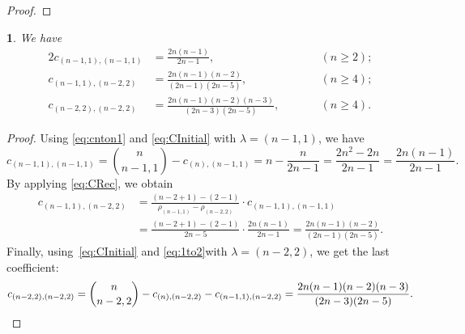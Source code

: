 \documentclass{mathincs}
\numberwithin{equation}{section}
\numberwithin{figure}{section}
\theoremstyle{plain}
\newtheorem{thm}{\protect\theoremname}[section]
\theoremstyle{definition}
\theoremstyle{remark}
\theoremstyle{plain}
\theoremstyle{definition}
\theoremstyle{plain}
\theoremstyle{plain}
\providecommand{\theoremname}{Theorem}
\begin{document}
\begin{proof}
\end{proof}

\begin{thm}
\label{thm:fam1}
We have
\begin{alignat*}{2}
  c_{(n-1,1),(n-1,1)} &= \frac{2n(n-1)}{2n-1}, &\qquad& (n\geq2); \\
  c_{(n-1,1),(n-2,2)} &= \frac{2n(n-1)(n-2)}{(2n-1)(2n-5)}, && (n\geq4); \\
  c_{(n-2,2),(n-2,2)} &= \frac{2n(n-1)(n-2)(n-3)}{(2n-3)(2n-5)}, &&(n\geq4).
\end{alignat*}
\end{thm}
\begin{proof}
Using \eqref{eq:cnton1} and  \eqref{eq:CInitial} with $\lambda=(n-1,1)$, we have
\[
  c_{(n-1,1),(n-1,1)}=\binom{n}{n-1,1}-c_{(n),(n-1,1)}=n-\frac{n}{2n-1}=\frac{2n^{2}-2n}{2n-1}=\frac{2n\left(n-1\right)}{2n-1}.
\]
By applying \eqref{eq:CRec}, we obtain
\begin{align*}
  c_{(n-1,1),(n-2,2)}
  &= \frac{(n-2+1)-(2-1)}{\rho_{(n-1,1)}-\rho_{(n-2,2)}}\cdot c_{(n-1,1),(n-1,1)}\\
  &= \frac{(n-2+1)-(2-1)}{2n-5}\cdot\frac{2n(n-1)}{2n-1}= \frac{2n(n-1)(n-2)}{(2n-1)(2n-5)}.
\end{align*}
Finally, using~\eqref{eq:CInitial} and \eqref{eq:1to2}with $\lambda=(n-2,2)$, we get the last coefficient:
\[
 c_{(n-2,2),(n-2,2)}=\binom{n}{n-2,2}-c_{(n),(n-2,2)}-c_{(n-1,1),(n-2,2)}=\frac{2n(n-1)(n-2)(n-3)}{(2n-3)(2n-5)}. \qedhere
\]
%
\end{proof}
\end{document}
